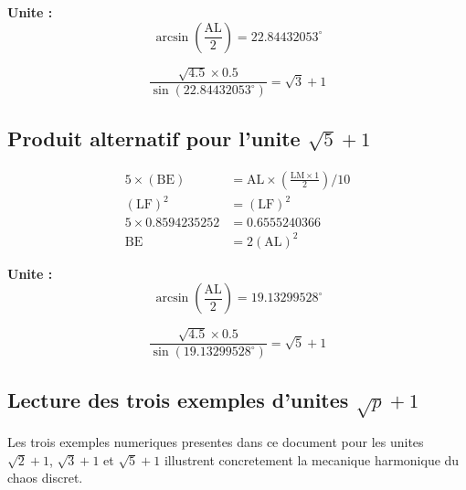 \documentclass[12pt,a4paper]{article}
\theoremstyle{definition}
\theoremstyle{remark}
\begin{document}
\noindent\textbf{Unite :}
\[
\arcsin\left(\frac{\mathrm{AL}}{2}\right) = 22.84432053^\circ
\]

\[
\frac{\sqrt{4.5} \times 0.5}{\sin(22.84432053^\circ)} = \sqrt{3} + 1
\]

\subsection{Produit alternatif pour l'unite $\sqrt{5}+1$}

\begin{align}
5 \times (\mathrm{BE}) &= \mathrm{AL} \times \left(\frac{\mathrm{LM} \times 1}{2}\right) / 10 \\
(\mathrm{LF})^{2} &= (\mathrm{LF})^{2} \\
5 \times 0.8594235252 &= 0.6555240366 \\
\mathrm{BE} &= 2(\mathrm{AL})^{2}
\end{align}

\noindent\textbf{Unite :}
\[
\arcsin\left(\frac{\mathrm{AL}}{2}\right) = 19.13299528^\circ
\]

\[
\frac{\sqrt{4.5} \times 0.5}{\sin(19.13299528^\circ)} = \sqrt{5} + 1
\]
\subsection{Lecture des trois exemples d'unites \texorpdfstring{$\sqrt{p} + 1$}{sqrt(p)+1}}

Les trois exemples numeriques presentes dans ce document pour les unites
$\sqrt{2} + 1$, $\sqrt{3} + 1$ et $\sqrt{5} + 1$ illustrent concretement
la mecanique harmonique du chaos discret.
\end{document}
